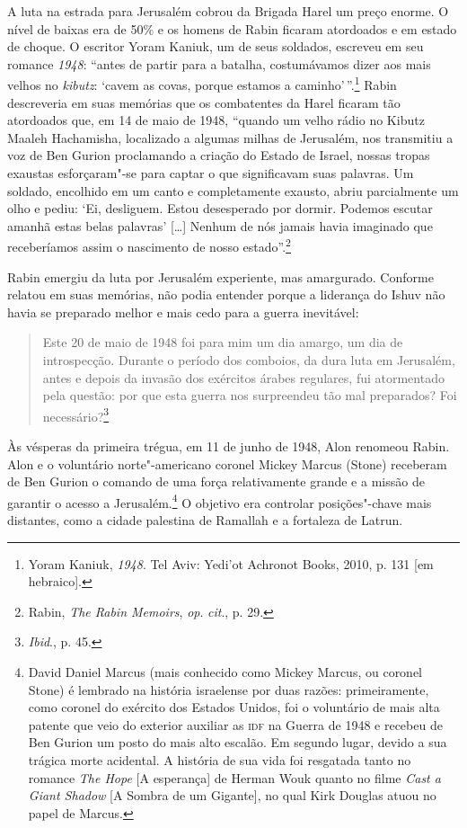 A luta na estrada para Jerusalém cobrou da Brigada Harel um preço
enorme. O nível de baixas era de 50\% e os homens de Rabin ficaram
atordoados e em estado de choque. O escritor Yoram Kaniuk, um de seus
soldados, escreveu em seu romance \textit{1948}: ``antes de partir para a
batalha, costumávamos dizer aos mais velhos no \textit{kibutz}: `cavem as covas,
porque estamos a caminho'\,''.\footnote{Yoram Kaniuk, \textit{1948}. Tel Aviv: Yedi'ot Achronot Books, 2010, p. 131 {[}em hebraico{]}.} Rabin descreveria em suas
memórias que os combatentes da Harel ficaram tão atordoados que, em 14
de maio de 1948, ``quando um velho rádio no Kibutz Maaleh Hachamisha,
localizado a algumas milhas de Jerusalém, nos transmitiu a voz de Ben
Gurion proclamando a criação do Estado de Israel, nossas tropas exaustas
esforçaram"-se para captar o que significavam suas palavras. Um soldado,
encolhido em um canto e completamente exausto, abriu parcialmente um olho e
pediu: `Ei, desliguem. Estou desesperado por dormir. Podemos escutar
amanhã estas belas palavras' {[}\ldots{}{]} Nenhum de nós jamais havia imaginado que
receberíamos assim o nascimento de nosso estado''.\footnote{Rabin,
\textit{The Rabin Memoirs}, \textit{op}. \textit{cit}., p. 29.}

Rabin emergiu da luta por Jerusalém experiente, mas amargurado. Conforme
relatou em suas memórias, não podia entender porque a liderança do
Ishuv não havia se preparado melhor e mais cedo para a guerra
inevitável: 

\begin{quote}
Este 20 de maio de 1948 foi para mim um dia amargo, um dia
de introspecção. Durante o período dos comboios, da dura luta em
Jerusalém, antes e depois da invasão dos exércitos árabes regulares, fui
atormentado pela questão: por que esta guerra nos surpreendeu tão mal
preparados? Foi necessário?\footnote{\textit{Ibid}., p. 45.}
\end{quote}

Às vésperas da primeira trégua, em 11 de junho de 1948, Alon renomeou
Rabin. Alon e o voluntário norte"-americano coronel Mickey Marcus (Stone)
receberam de Ben Gurion o comando de uma força relativamente grande e a
missão de garantir o acesso a Jerusalém.\footnote{David Daniel Marcus 
(mais conhecido como Mickey Marcus, ou coronel Stone) é lembrado na história israelense
por duas razões: primeiramente, como coronel do exército
dos Estados Unidos, foi o voluntário de mais alta patente que veio do
exterior auxiliar as \textsc{idf} na Guerra de 1948 e recebeu de Ben Gurion um
posto do mais alto escalão. Em segundo lugar, devido a sua trágica morte
acidental. A história de sua vida foi resgatada tanto no romance \textit{The Hope} {[}A esperança{]} de
Herman Wouk quanto no filme \textit{Cast a Giant Shadow} {[}A Sombra de um
Gigante{]}, no qual Kirk Douglas atuou no papel de Marcus.} O objetivo era controlar
posições"-chave mais distantes, como a cidade palestina de Ramallah e a
fortaleza de Latrun.

